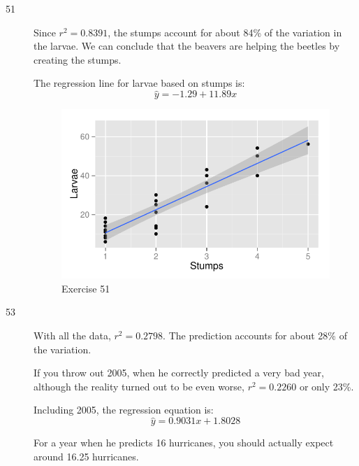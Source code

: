 \documentclass[letterpaper, landscape]{exam}
\begin{document}
\begin{description}

      \item[51]
        Since $r^2 = 0.8391$, the stumps account for about 84\% of the variation
        in the larvae.  We can conclude that the beavers are helping the beetles
        by creating the stumps.

        The regression line for larvae based on stumps is:
        \[
          \hat{y} = -1.29 + 11.89 x 
        \]

        \begin{figure}[H]
          \centering
          \includegraphics[scale = 0.9]{figures/ex51.pdf}
          \caption{Exercise 51}
        \end{figure}

      \item[53]
        With all the data, $r^2 = 0.2798$.  The prediction accounts for about
        28\% of the variation.  
        
        If you throw out 2005, when he correctly predicted a very bad year,
        although the reality turned out to be even worse, $r^2 = 0.2260$ or only
        23\%.

        Including 2005, the regression equation is:
        \[
          \hat{y} = 0.9031 x + 1.8028
        \]

        For a year when he predicts 16 hurricanes, you should actually expect
        around 16.25 hurricanes.


\end{description}
\end{document}
